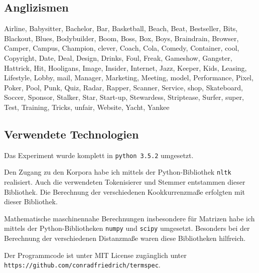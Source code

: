 \documentclass[11pt,numbers=noenddot]{scrartcl}
\begin{document}
\subsection{Anglizismen}

Airline, Babysitter, Bachelor, Bar, Basketball, Beach, Beat, Bestseller, Bits, Blackout, Blues, Bodybuilder, Boom, Boss, Box, Boys, Braindrain, Browser, Camper, Campus, Champion, clever, Coach, Cola, Comedy, Container, cool, Copyright, Date, Deal, Design, Drinks, Foul, Freak, Gameshow, Gangster, Hattrick, Hit, Hooligans, Image, Insider, Internet, Jazz, Keeper, Kids, Leasing, Lifestyle, Lobby, mail, Manager, Marketing, Meeting, model, Performance, Pixel, Poker, Pool, Punk, Quiz, Radar, Rapper, Scanner, Service, shop, Skateboard, Soccer, Sponsor, Stalker, Star, Start-up, Stewardess, Striptease, Surfer, super, Test, Training, Tricks, unfair, Website, Yacht, Yankee

\subsection{Verwendete Technologien}

Das Experiment wurde komplett in \texttt{python 3.5.2} umgesetzt.

Den Zugang zu den Korpora habe ich mittels der Python-Bibliothek \texttt{nltk} realisiert. Auch die verwendeten Tokenisierer und Stemmer entstammen dieser Bibliothek. Die Berechnung der verschiedenen Kookkurrenzmaße erfolgten mit dieser Bibliothek.

Mathematische maschinennahe Berechnungen insbesondere für Matrizen habe ich mittels der Python-Bibliotheken 
\texttt{numpy} und \texttt{scipy} umgesetzt. Besonders bei der Berechnung der verschiedenen Distanzmaße waren diese Bibliotheken hilfreich.

Der Programmcode ist unter MIT License zugänglich unter \\ \texttt{https://github.com/conradfriedrich/termspec}.



\nocite{han2011}
\nocite{heyer2008}
\nocite{manning1999}


\end{document}
